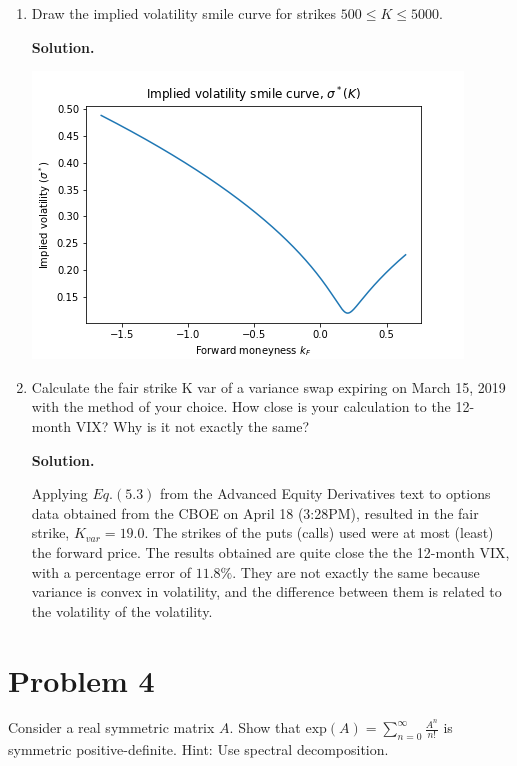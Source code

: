 \documentclass[12pt]{article}
\newcommand{\Exp}[1]{\text{exp}(#1)}
\newenvironment{solution}{\vspace{0.2cm} \textbf{Solution.}}{}
\begin{document}
	\begin{enumerate}[label=(\alph*)]
	\item Draw the implied volatility smile curve for strikes $500 \leq K \leq 5000$.
	
	\begin{solution}
	
	\includegraphics{impliedVol.png}
	
	\end{solution}
	
	\item Calculate the fair strike K var of a variance swap expiring on March 15, 2019 with the method of your choice. How close is your calculation to the 12-month VIX? Why is it not exactly the same?
	
	\begin{solution}
	
	Applying $Eq. (5.3)$ from the Advanced Equity Derivatives text to options data obtained from the CBOE on April 18 (3:28PM), resulted in the fair strike, $K_{var}=19.0.$  The strikes of the puts (calls) used were at most (least) the forward price.
	The results obtained are quite close the the 12-month VIX, with a percentage error of $11.8\%.$  They are not exactly the same because variance is convex in volatility, and the difference between them is related to the volatility of the volatility.
	
	
	\end{solution}	

	\end{enumerate}

\newpage

	\section*{Problem 4}
Consider a real symmetric matrix $A$. Show that $\Exp{A} = \sum_{n=0}^{\infty} \frac{A^n}{n!}$ is symmetric positive-definite.
Hint: Use spectral decomposition.
\end{document}

